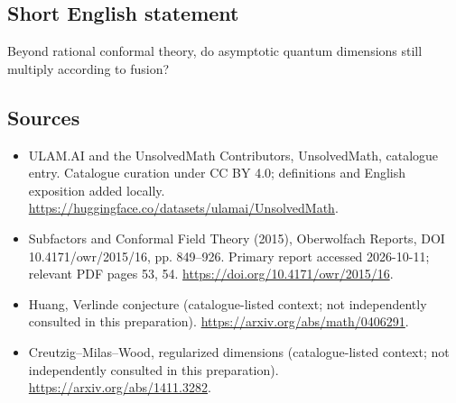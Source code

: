 \documentclass[11pt]{article}
\begin{document}
\subsection{Short English statement}
Beyond rational conformal theory, do asymptotic quantum dimensions still multiply according to fusion?
\subsection{Sources}
\begin{itemize}
\item[\hypertarget{source:statement:1}{S1}] ULAM.AI and the UnsolvedMath Contributors, UnsolvedMath, catalogue entry. Catalogue curation under CC BY 4.0; definitions and English exposition added locally.
\url{https://huggingface.co/datasets/ulamai/UnsolvedMath}.
\item[\hypertarget{source:statement:2}{S2}] Subfactors and Conformal Field Theory (2015), Oberwolfach Reports, DOI 10.4171/owr/2015/16, pp. 849--926. Primary report accessed 2026-10-11; relevant PDF pages 53, 54.
\url{https://doi.org/10.4171/owr/2015/16}.
\item[\hypertarget{source:statement:3}{S3}] Huang, Verlinde conjecture (catalogue-listed context; not independently consulted in this preparation).
\url{https://arxiv.org/abs/math/0406291}.
\item[\hypertarget{source:statement:4}{S4}] Creutzig--Milas--Wood, regularized dimensions (catalogue-listed context; not independently consulted in this preparation).
\url{https://arxiv.org/abs/1411.3282}.
\end{itemize}
\label{end:statement}
\end{document}
